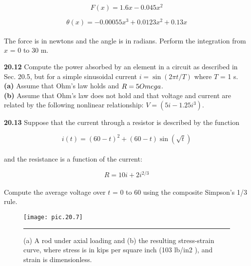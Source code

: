 \documentclass[../main.tex]{subfiles}
\begin{document}
\begin{multicols}{2}
	$$F(x) = 1.6x - 0.045x^{2}$$
	
	$$\theta(x) = -0.00055x^{3} + 0.0123x^{2} + 0.13x $$\\
The force is in newtons and the angle is in radians. Perform
the integration from $x$ = 0 to 30 m.

\textbf{20.12} Compute the power absorbed by an element in a circuit as described in Sec. 20.5, but for a simple sinusoidal
current $i = \sin (2\pi t/T)$ where $T$ = 1 s. \\
\textbf{(a)} Assume that Ohm's law holds and $R = 5 \\Omega$.\\
\textbf{(b)} Assume that Ohm's law does not hold and that voltage
and current are related by the following nonlinear relationship: $V = (5i - 1.25i^{3})$.

\textbf{20.13} Suppose that the current through a resistor is described by the function

	$$i(t) = (60 - t)^{2} + (60 - t) \sin (\sqrt{t})$$\\
and the resistance is a function of the current:

	$$R = 10i + 2i^{2/3}$$\\
Compute the average voltage over $t$ = 0 to 60 using the
composite Simpson's 1/3 rule.

\end{multicols}

\pagebreak


\begin{figure}[hbt!]
	\centering
	\texttt{[image: pic.20.7]}
	\caption{\textsf{(a) A rod under axial loading and (b) the resulting stress-strain curve, where
stress is in kips per square inch (103 lb/in2
), and strain is dimensionless.}} \hrule
	\label{pic.20.7}
\end{figure}
\end{document}
